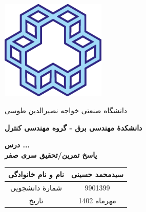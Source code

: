 \begin{titlepage}
\begin{center}
\centerline{{\includegraphics[width=5cm]{img/Logo.png}}}
\centerline{\textcolor[rgb]{0,0,0.5}{\nast \large  دانشگاه صنعتی خواجه نصیرالدین طوسی}}
\centerline{\textcolor[rgb]{0,0,0.5}{\nast \bfseries دانشکدۀ مهندسی برق - گروه مهندسی کنترل}}

\vfill
        
\Huge
\textbf{درس ...}\\
\textbf{پاسخ تمرین/تحقیق سری صفر}\\
        
\vfill
        
\begin{table}[ht]
    \centering
    \huge
    \begin{tabular}{|c|c|}
    \hline
    نام و نام خانوادگی & سیدمحمد حسینی\\
    \hline
    شمارۀ دانشجویی & 9901399\\
    \hline
    تاریخ & مهرماه 1402\\
    \hline
    \end{tabular}
\end{table}
\end{center}
\end{titlepage}
